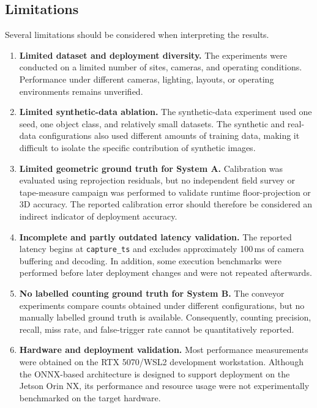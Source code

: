 \documentclass[9pt,a4paper,twocolumn]{rho-class/rho}
\begin{document}
\subsection{Limitations}

Several limitations should be considered when interpreting the results.

\begin{enumerate}
    \item \textbf{Limited dataset and deployment diversity.} The experiments were conducted on a limited number of sites, cameras, and operating conditions. Performance under different cameras, lighting, layouts, or operating environments remains unverified.
    \item \textbf{Limited synthetic-data ablation.} The synthetic-data experiment used one seed, one object class, and relatively small datasets. The synthetic and real-data configurations also used different amounts of training data, making it difficult to isolate the specific contribution of synthetic images.
    \item \textbf{Limited geometric ground truth for System A.} Calibration was evaluated using reprojection residuals, but no independent field survey or tape-measure campaign was performed to validate runtime floor-projection or 3D accuracy. The reported calibration error should therefore be considered an indirect indicator of deployment accuracy.
    \item \textbf{Incomplete and partly outdated latency validation.} The reported latency begins at \texttt{capture\_ts} and excludes approximately 100\,ms of camera buffering and decoding. In addition, some execution benchmarks were performed before later deployment changes and were not repeated afterwards.
    \item \textbf{No labelled counting ground truth for System B.} The conveyor experiments compare counts obtained under different configurations, but no manually labelled ground truth is available. Consequently, counting precision, recall, miss rate, and false-trigger rate cannot be quantitatively reported.
    \item \textbf{Hardware and deployment validation.} Most performance measurements were obtained on the RTX 5070/WSL2 development workstation. Although the ONNX-based architecture is designed to support deployment on the Jetson Orin NX, its performance and resource usage were not experimentally benchmarked on the target hardware.
\end{enumerate}
\end{document}
